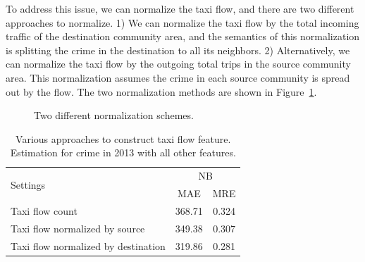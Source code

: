 To address this issue, we can normalize the taxi flow, and there are two different approaches to normalize. 1) We can normalize the taxi flow by the total incoming traffic of the destination community area, and the semantics of this normalization is splitting the crime in the destination to all its neighbors. 2) Alternatively, we can normalize the taxi flow by the outgoing total trips in the source community area. This normalization assumes the crime in each source community is spread out by the flow.  The two normalization methods are shown in Figure~\ref{fig:taxiflow-norm}.


\begin{figure}[h]
\centering
{}
\caption{Two different normalization schemes.}
\label{fig:taxiflow-norm}
\end{figure}



\begin{table}[h]
\centering
\caption{Various approaches to construct taxi flow feature. Estimation for crime in 2013 with all other features.}
\vspace{2mm}
\label{tb:tf-design}
\begin{tabular}{|l|c|c|}
\hline
\multirow{2}{*}{Settings} & \multicolumn{2}{|c|}{NB} \\ \cline{2-3}
	& MAE & MRE \\ \hline
Taxi flow count & 368.71 & 0.324 \\ \hline
Taxi flow normalized by source & 349.38 & 0.307 \\ \hline
Taxi flow normalized by destination & 319.86& 0.281\\ \hline
\end{tabular}
\end{table}


